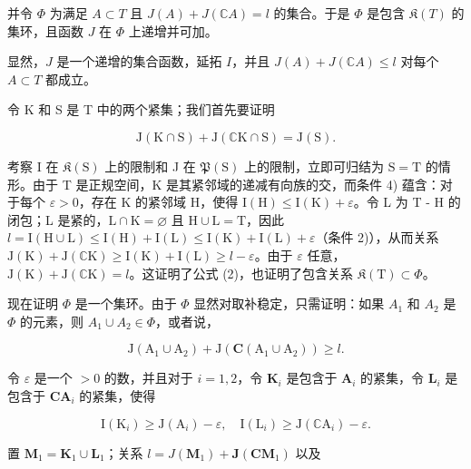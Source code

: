 并令 \(\Phi\) 为满足 \(A \subset T\) 且 \(J(A) + J(\mathbb{C}A) = l\) 的集合。于是 \(\Phi\) 是包含 \(\mathfrak{K}(T)\) 的集环，且函数 \(J\) 在 \(\Phi\) 上递增并可加。

显然，\(J\) 是一个递增的集合函数，延拓 \(I\)，并且 \(J(A) + J(\mathbb{C}A) \leqslant l\) 对每个 \(A \subset T\) 都成立。

令 K 和 S 是 T 中的两个紧集；我们首先要证明

\[
\mathrm{J} (\mathrm{K} \cap \mathrm{S}) + \mathrm{J} (\mathbb {C} \mathrm{K} \cap \mathrm{S}) = \mathrm{J} (\mathrm{S}).\tag{2}
\]

考察 I 在 \(\mathfrak{K}(\mathrm{S})\) 上的限制和 J 在 \(\mathfrak{P}(\mathrm{S})\) 上的限制，立即可归结为 \(\mathrm{S} = \mathrm{T}\) 的情形。由于 T 是正规空间，K 是其紧邻域的递减有向族的交，而条件 4) 蕴含：对于每个 \(\varepsilon > 0\)，存在 K 的紧邻域 H，使得 \(\mathrm{I}(\mathrm{H}) \leqslant \mathrm{I}(\mathrm{K}) + \varepsilon\)。令 L 为 T - H 的闭包；L 是紧的，\(\mathrm{L} \cap \mathrm{K} = \varnothing\) 且 \(\mathrm{H} \cup \mathrm{L} = \mathrm{T}\)，因此 \(l = \mathrm{I}(\mathrm{H} \cup \mathrm{L}) \leqslant \mathrm{I}(\mathrm{H}) + \mathrm{I}(\mathrm{L}) \leqslant \mathrm{I}(\mathrm{K}) + \mathrm{I}(\mathrm{L}) + \varepsilon\)（条件 2)），从而关系 \(\mathrm{J}(\mathrm{K}) + \mathrm{J}(\mathbb{C}\mathrm{K}) \geqslant \mathrm{I}(\mathrm{K}) + \mathrm{I}(\mathrm{L}) \geqslant l - \varepsilon\)。由于 \(\varepsilon\) 任意，\(\mathrm{J}(\mathrm{K}) + \mathrm{J}(\mathbb{C}\mathrm{K}) = l\)。这证明了公式 (2)，也证明了包含关系 \(\mathfrak{K}(\mathrm{T}) \subset \Phi\)。

现在证明 \(\Phi\) 是一个集环。由于 \(\Phi\) 显然对取补稳定，只需证明：如果 \(A_{1}\) 和 \(A_{2}\) 是 \(\Phi\) 的元素，则 \(A_{1} \cup A_{2} \in \Phi\)，或者说，

\[
\mathrm{J} \left(\mathrm{A} _ {1} \cup \mathrm{A} _ {2}\right) + \mathrm{J} \left(\mathbf {C} \left(\mathrm{A} _ {1} \cup \mathrm{A} _ {2}\right)\right) \geqslant l.\tag{3}
\]

令 \(\varepsilon\) 是一个 \(>0\) 的数，并且对于 \(i = 1,2\)，令 \(\mathbf{K}_i\) 是包含于 \(\mathbf{A}_i\) 的紧集，令 \(\mathbf{L}_i\) 是包含于 \(\mathbf{C}\mathbf{A}_i\) 的紧集，使得

\[
\mathrm{I} \left(\mathrm{K} _ {i}\right) \geqslant \mathrm{J} \left(\mathrm{A} _ {i}\right) - \varepsilon , \quad \mathrm{I} \left(\mathrm{L} _ {i}\right) \geqslant \mathrm{J} \left(\mathbb {C} \mathrm{A} _ {i}\right) - \varepsilon .
\]

置 \(\mathbf{M}_1 = \mathbf{K}_1\cup \mathbf{L}_1\)；关系 \(l = J(\mathbf{M}_1) + \mathbf{J}(\mathbf{C}\mathbf{M}_1)\) 以及


